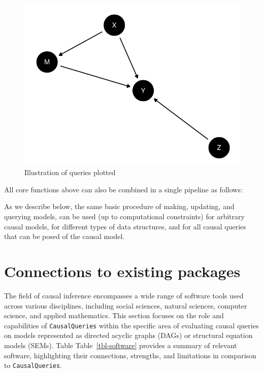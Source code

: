 \documentclass[
  11pt,
  article]{jss}
\begin{document}
\begin{figure}[H]

{\centering \includegraphics{paper_files/figure-pdf/unnamed-chunk-7-1.pdf}

}

\caption{Illustration of queries plotted}

\end{figure}%

All core functions above can also be combined in a single pipeline as
follows:

As we describe below, the same basic procedure of making, updating, and
querying models, can be used (up to computational constraints) for
arbitrary causal models, for different types of data structures, and for
all causal queries that can be posed of the causal model.

\section{Connections to existing
packages}\label{connections-to-existing-packages}

The field of causal inference encompasses a wide range of software tools
used across various disciplines, including social sciences, natural
sciences, computer science, and applied mathematics. This section
focuses on the role and capabilities of \texttt{CausalQueries} within
the specific area of evaluating causal queries on models represented as
directed acyclic graphs (DAGs) or structural equation models (SEMs).
Table Table~\ref{tbl-software} provides a summary of relevant software,
highlighting their connections, strengths, and limitations in comparison
to \texttt{CausalQueries}.
\end{document}
